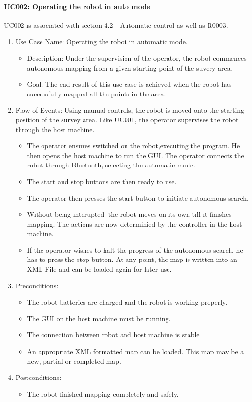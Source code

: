 \documentclass[11pt, a4paper]{report}
\begin{document}
\paragraph {UC002: Operating the robot in auto mode}
UC002 is associated with section 4.2 - Automatic control as well as R0003.
\begin{enumerate}
	\item Use Case Name: Operating the robot in automatic mode.
	\begin{itemize}
		\item Description: Under the supervision of the operator, the robot commences autonomous mapping from
		a given starting point of the suvery area.
		\item Goal: The end result of this use case is achieved when the robot has successfully mapped all the points in the area.
	\end{itemize}
	\item  Flow of Events: Using manual controls, the robot is moved onto the starting position of the
survey area. Like UC001, the operator supervises the robot through the host machine.
	\begin{itemize}
		\item The operator ensures switched on the robot,executing the program. He then
opens the host machine to run the GUI. The operator connects the robot through Bluetooth, selecting the automatic mode.
		\item The start and stop buttons are then ready to use.
		\item The operator then presses the start button to initiate autonomous search.
		\item Without being interupted, the robot moves on its own till it finishes mapping. The actions are now determinied by the controller in the host machine.
		\item If the operator wishes to halt the progress of the autonomous search, he has to press the stop
button. At any point, the map is written into an XML File and can be loaded again for later
use.
	\end{itemize}
	\item Preconditions:
	\begin{itemize}
		\item The robot batteries are charged and the robot is working properly.
		\item The GUI on the host machine must be running.
		\item The connection between robot and host machine is stable
		\item An appropriate XML formatted map can be loaded. This map may be a new, partial or
completed map.
	\end{itemize}
	\item Postconditions:
	\begin{itemize}
		\item The robot finished mapping completely and safely.
	\end{itemize}
\end{enumerate}
\end{document}
